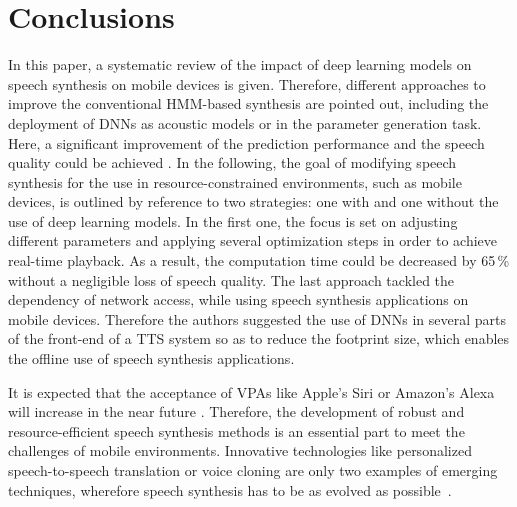

\section{Conclusions}
\label{sec:conclusion}

In this paper, a systematic review of the impact of deep learning models on speech synthesis on mobile devices is given. Therefore, different approaches to improve the conventional \ac{HMM}-based synthesis are pointed out, including the deployment of \acp{DNN} as acoustic models or in the parameter generation task. Here, a significant improvement of the prediction performance and the speech quality could be achieved \cite{zen:deepstatistical, hashimoto:effect}. In the following, the goal of modifying speech synthesis for the use in resource-constrained environments, such as mobile devices, is outlined by reference to two strategies: one with and one without the use of deep learning models. In the first one, the focus is set on adjusting different parameters and applying several optimization steps \cite{toth:optimizing} in order to achieve real-time playback. As a result, the computation time could be decreased by 65\,\% without a negligible loss of speech quality. The last approach \cite{boros:robust} tackled the dependency of network access, while using speech synthesis applications on mobile devices. Therefore the authors suggested the use of \acp{DNN} in several parts of the front-end of a \ac{TTS} system so as to reduce the footprint size, which enables the offline use of speech synthesis applications.

It is expected that the acceptance of \acp{VPA} like Apple's Siri or Amazon's Alexa will increase in the near future \cite{gartner:assistants}. Therefore, the development of robust and resource-efficient speech synthesis methods is an essential part to meet the challenges of mobile environments. Innovative technologies like personalized speech-to-speech translation or voice cloning are only two examples of emerging techniques, wherefore speech synthesis has to be as evolved as possible~\cite{edinburgh:speech}.

\iffalse
\vspace{2em}
See \cite{edinburgh:speech}
\begin{itemize}[leftmargin=10pt]
	\item Voice cloning
	\item Voice reconstruction
	\item Personalised speech-to-speech translation
	\item Articulatory-controllable speech synthesis
\end{itemize}
\fi